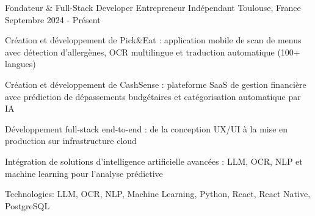 


\begin{cventries}


\cventry
{Fondateur \& Full-Stack Developer} %
{Entrepreneur Indépendant} %
{Toulouse, France} %
{Septembre 2024 - Présent} %
{ %
\begin{cvitems}
\item {Création et développement de Pick\&Eat : application mobile de scan de menus avec détection d'allergènes, OCR multilingue et traduction automatique (100+ langues)}
\item {Création et développement de CashSense : plateforme SaaS de gestion financière avec prédiction de dépassements budgétaires et catégorisation automatique par IA}
\item {Développement full-stack end-to-end : de la conception UX/UI à la mise en production sur infrastructure cloud}
\item {Intégration de solutions d'intelligence artificielle avancées : LLM, OCR, NLP et machine learning pour l'analyse prédictive}
\item {Technologies: LLM, OCR, NLP, Machine Learning, Python, React, React Native, PostgreSQL}
\end{cvitems}
}

\vspace{1.5em}



\end{cventries}
